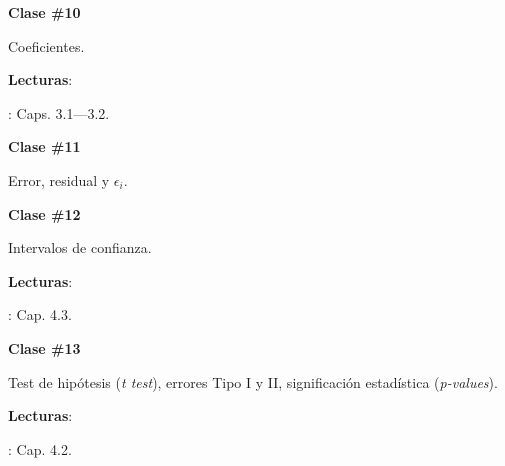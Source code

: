 \documentclass[letterpaper]{article}
\renewenvironment{itemize}{
  \begin{list}{}{
    \setlength{\leftmargin}{1.5em}
  }
}{
  \end{list}
}
\begin{document}
\begin{enumerate}
			\begin{itemize} 
				\item[$\bullet$] {\bf Clase \#10}
					\begin{itemize} 
						\item[$\circ$] Coeficientes. %
						\item[$\circ$] {\bf Lecturas}: 
							\begin{itemize}
								\item[$\diamond$] \textcite{Wooldridge2010}: Caps. 3.1---3.2.
							\end{itemize}
					\end{itemize}
			\end{itemize}



			\begin{itemize} 
				\item[$\bullet$] {\bf Clase \#11}
					\begin{itemize} 
						\item[$\circ$] Error, residual y $\epsilon_{i}$.
					\end{itemize}
			\end{itemize}



			\begin{itemize} 
				\item[$\bullet$] {\bf Clase \#12}
					\begin{itemize} 
						\item[$\circ$] Intervalos de confianza. %
						\item[$\circ$] {\bf Lecturas}: 
							\begin{itemize}
								\item[$\diamond$] \textcite{Wooldridge2010}: Cap. 4.3.
							\end{itemize}
					\end{itemize}
			\end{itemize}



			\begin{itemize} 
				\item[$\bullet$] {\bf Clase \#13}
					\begin{itemize} 
						\item[$\circ$] Test de hip\'otesis (\emph{t test}), errores Tipo I y II,  significaci\'on estad\'istica (\emph{p-values}). 
						\item[$\circ$] {\bf Lecturas}: 
							\begin{itemize}
								\item[$\diamond$] \textcite{Wooldridge2010}: Cap. 4.2.
							\end{itemize}
					\end{itemize}
			\end{itemize}




\end{enumerate}
\end{document}
